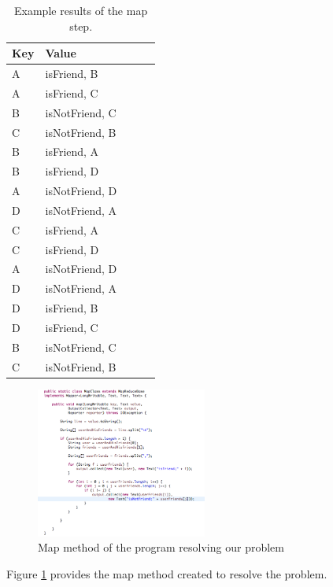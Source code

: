 \documentclass[10pt, conference]{IEEEtran}
\begin{document}
\begin{center}
\begin{table}
\begin{center}
\begin{tabular}{|l|l|l|l|l|}
  \hline
  Key & Value \\
  \hline
 A & isFriend, B \\
 A & isFriend, C \\
 B & isNotFriend, C \\
 C & isNotFriend, B \\
 B & isFriend, A \\
 B & isFriend, D \\
 A & isNotFriend, D \\
 D & isNotFriend, A \\
 C & isFriend, A \\
 C & isFriend, D \\
 A & isNotFriend, D \\
 D & isNotFriend, A \\
 D & isFriend, B \\
 D & isFriend, C \\
 B & isNotFriend, C \\
 C & isNotFriend, B \\
  \hline
\end{tabular}
\caption{\label{MapExampleProblem} Example results of the map step.}
\end{center}
\end{table}
\end{center}


\begin{figure}
	\includegraphics[width=0.5\textwidth]{plots/map.png}
	\caption{\label{mapProgram} Map method of the program resolving our problem}
\end{figure}

Figure \ref{mapProgram} provides the map method created to resolve the problem.
\end{document}
